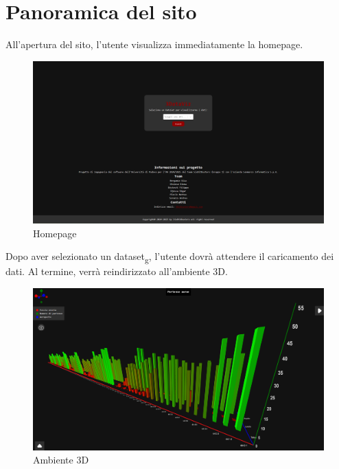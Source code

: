 \section{Panoramica del sito}
All'apertura del sito, l'utente visualizza immediatamente la homepage.
\begin{figure}[h!]
    \centering
    \includegraphics[scale=0.3]{template/images/home/homepage.png}
    \caption{Homepage}
\end{figure}
\newline
\newline
Dopo aver selezionato un dataset\textsubscript{g}, l'utente dovrà attendere il caricamento dei dati. Al termine, verrà reindirizzato all'ambiente 3D.
\begin{figure}[h!]
    \centering
    \includegraphics[scale=0.3]{template/images/env/envpage.png}
    \caption{Ambiente 3D}
\end{figure}
